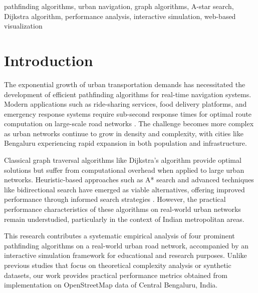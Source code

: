 \documentclass[conference]{IEEEtran}
\begin{document}
\begin{IEEEkeywords}
pathfinding algorithms, urban navigation, graph algorithms, A-star search, Dijkstra algorithm, performance analysis, interactive simulation, web-based visualization
\end{IEEEkeywords}

\section{Introduction}

The exponential growth of urban transportation demands has necessitated the development of efficient pathfinding algorithms for real-time navigation systems. Modern applications such as ride-sharing services, food delivery platforms, and emergency response systems require sub-second response times for optimal route computation on large-scale road networks \cite{dijkstra1959note}. The challenge becomes more complex as urban networks continue to grow in density and complexity, with cities like Bengaluru experiencing rapid expansion in both population and infrastructure.

Classical graph traversal algorithms like Dijkstra's algorithm provide optimal solutions but suffer from computational overhead when applied to large urban networks. Heuristic-based approaches such as A* search and advanced techniques like bidirectional search have emerged as viable alternatives, offering improved performance through informed search strategies \cite{hart1968formal}. However, the practical performance characteristics of these algorithms on real-world urban networks remain understudied, particularly in the context of Indian metropolitan areas.

This research contributes a systematic empirical analysis of four prominent pathfinding algorithms on a real-world urban road network, accompanied by an interactive simulation framework for educational and research purposes. Unlike previous studies that focus on theoretical complexity analysis or synthetic datasets, our work provides practical performance metrics obtained from implementation on OpenStreetMap data of Central Bengaluru, India.
\end{document}
